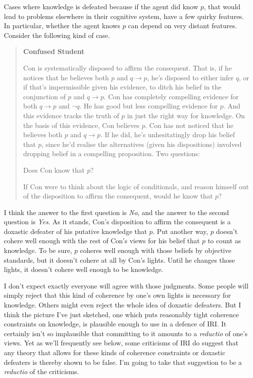 \documentclass[11pt,oneside]{book}
\begin{document}
Cases where knowledge is defeated because if the agent did know $p$, that would lead to problems elsewhere in their cognitive system, have a few quirky features. In particular, whether the agent knows $p$ can depend on very distant features. Consider the following kind of case.

\begin{quote}

\textbf{Confused Student}

Con is systematically disposed to affirm the consequent. That is, if he notices that he believes both $p$ and $q \rightarrow p$, he's disposed to either infer $q$, or if that's impermissible given his evidence, to ditch his belief in the conjunction of $p$ and $q \rightarrow p$. Con has completely compelling evidence for both $q \rightarrow p$ and $\neg q$. He has good but less compelling evidence for $p$. And this evidence tracks the truth of $p$ in just the right way for knowledge. On the basis of this evidence, Con believes $p$. Con has not noticed that he believes both $p$ and $q \rightarrow p$. If he did, he's unhesitatingly drop his belief that $p$, since he'd realise the alternatives (given his dispositions) involved dropping belief in a compelling proposition. Two questions:
\begin{itemize*}
\item Does Con know that $p$?
\item If Con were to think about the logic of conditionals, and reason himself out of the disposition to affirm the consequent, would he know that $p$?
\end{itemize*}
\end{quote}

\noindent I think the answer to the first question is \textit{No}, and the answer to the second question is \textit{Yes}. As it stands, Con's disposition to affirm the consequent is a doxastic defeater of his putative knowledge that $p$. Put another way, $p$ doesn't cohere well enough with the rest of Con's views for his belief that $p$ to count as knowledge. To be sure, $p$ coheres well enough with those beliefs by objective standards, but it doesn't cohere at all by Con's lights. Until he changes those lights, it doesn't cohere well enough to be knowledge.

I don't expect exactly everyone will agree with those judgments. Some people will simply reject that this kind of coherence by one's own lights is necessary for knowledge. Others might even reject the whole idea of doxastic defeaters. But I think the picture I've just sketched, one which puts reasonably tight coherence constraints on knowledge, is plausible enough to use in a defence of IRI. It certainly isn't so implausible that committing to it amounts to a \textit{reductio} of one's views. Yet as we'll frequently see below, some criticisms of IRI do suggest that any theory that allows for these kinds of coherence constraints or doxastic defeaters is thereby shown to be false. I'm going to take that suggestion to be a \textit{reductio} of the criticisms.
\end{document}
